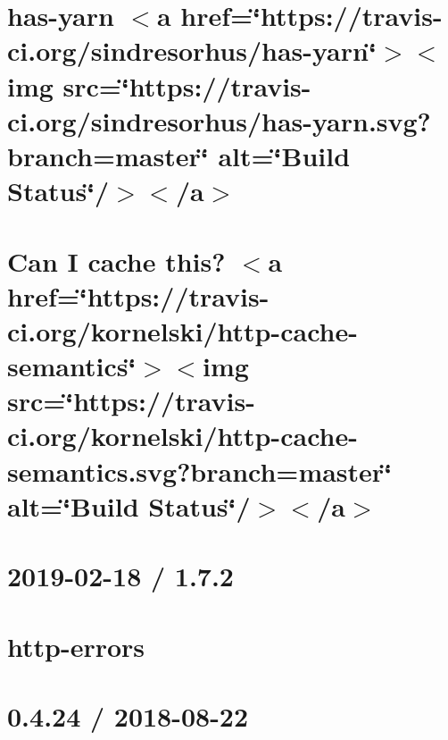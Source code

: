 \let\mypdfximage\pdfximage\def\pdfximage{\immediate\mypdfximage}\documentclass[twoside]{book}
\newcommand{\+}{\discretionary{\mbox{\scriptsize$\hookleftarrow$}}{}{}}
\begin{document}
\chapter{has-\/yarn $<$a href=\char`\"{}https\+://travis-\/ci.\+org/sindresorhus/has-\/yarn\char`\"{}$>$$<$img src=\char`\"{}https\+://travis-\/ci.\+org/sindresorhus/has-\/yarn.\+svg?branch=master\char`\"{} alt=\char`\"{}\+Build Status\char`\"{}/$>$$<$/a$>$}
\label{md__c_1__git_hub__p_r_o_y_e_c_t_o-_i_i_i-_g_o_t_rest-api_node_modules_has-yarn_readme}

\chapter{Can I cache this? $<$a href=\char`\"{}https\+://travis-\/ci.\+org/kornelski/http-\/cache-\/semantics\char`\"{}$>$$<$img src=\char`\"{}https\+://travis-\/ci.\+org/kornelski/http-\/cache-\/semantics.\+svg?branch=master\char`\"{} alt=\char`\"{}\+Build Status\char`\"{}/$>$$<$/a$>$}
\label{md__c_1__git_hub__p_r_o_y_e_c_t_o-_i_i_i-_g_o_t_rest-api_node_modules_http-cache-semantics__r_e_a_d_m_e}

\chapter{2019-\/02-\/18 / 1.7.2}
\label{md__c_1__git_hub__p_r_o_y_e_c_t_o-_i_i_i-_g_o_t_rest-api_node_modules_http-errors__h_i_s_t_o_r_y}

\chapter{http-\/errors}
\label{md__c_1__git_hub__p_r_o_y_e_c_t_o-_i_i_i-_g_o_t_rest-api_node_modules_http-errors__r_e_a_d_m_e}

\chapter{0.4.24 / 2018-\/08-\/22}
\label{md__c_1__git_hub__p_r_o_y_e_c_t_o-_i_i_i-_g_o_t_rest-api_node_modules_iconv-lite__changelog}

\end{document}
